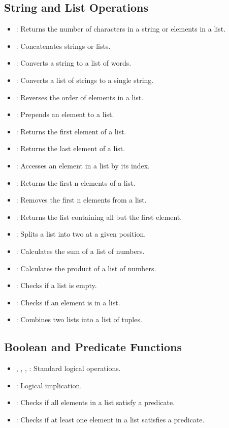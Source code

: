 \subsection{String and List Operations}
\begin{itemize}
    \item {}: Returns the number of characters in a string or elements in a list.
    \item \code{++}: Concatenates strings or lists.
    \item {}: Converts a string to a list of words.
    \item {}: Converts a list of strings to a single string.
    \item {}: Reverses the order of elements in a list.
    \item \code{:}: Prepends an element to a list.
    \item {}: Returns the first element of a list.
    \item {}: Returns the last element of a list.
    \item \code{!!}: Accesses an element in a list by its index.
    \item {}: Returns the first n elements of a list.
    \item {}: Removes the first n elements from a list.
    \item {}: Returns the list containing all but the first element.
    \item {}: Splits a list into two at a given position.
    \item {}: Calculates the sum of a list of numbers.
    \item {}: Calculates the product of a list of numbers.
    \item {}: Checks if a list is empty.
    \item {}: Checks if an element is in a list.
    \item {}: Combines two lists into a list of tuples.
\end{itemize}

\subsection{Boolean and Predicate Functions}
\begin{itemize}
    \item \code{\&\&}, \code{||}, , : Standard logical operations.
    \item {}: Logical implication.
    \item {}: Checks if all elements in a list satisfy a predicate.
    \item {}: Checks if at least one element in a list satisfies a predicate.
\end{itemize}

